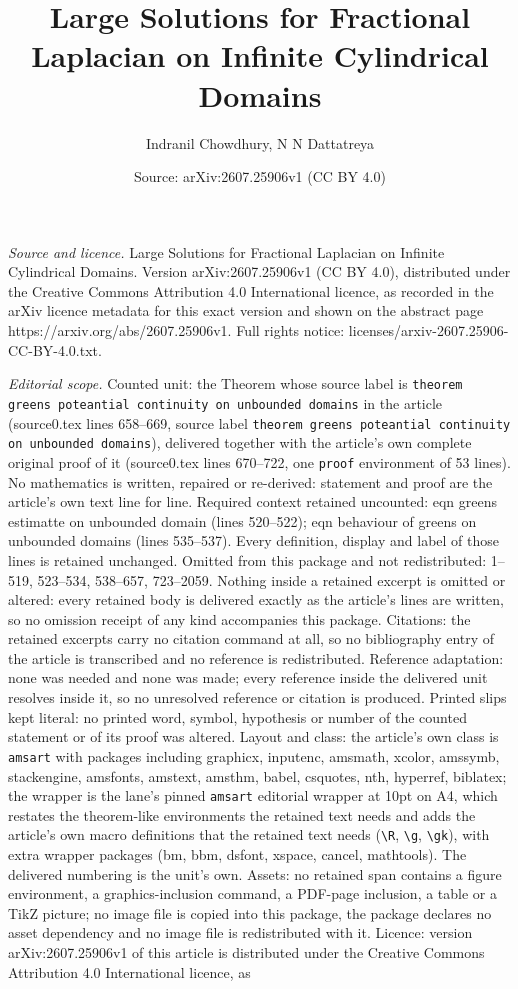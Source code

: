 \documentclass[10pt,a4paper]{amsart}
\title[Large Solutions for Fractional Laplacian on Infinite Cylindr]{Large Solutions for Fractional Laplacian on Infinite Cylindrical Domains}
\author{Indranil Chowdhury, N N Dattatreya}
\date{Source: arXiv:2607.25906v1 (CC BY 4.0)}
\begin{document}
\maketitle

\noindent\emph{Source and licence.} Large Solutions for Fractional Laplacian on Infinite Cylindrical Domains. Version arXiv:2607.25906v1 (CC BY 4.0), distributed under the Creative Commons Attribution 4.0 International licence, as recorded in the arXiv licence metadata for this exact version and shown on the abstract page https://arxiv.org/abs/2607.25906v1. Full rights notice: licenses/arxiv-2607.25906-CC-BY-4.0.txt.\par\smallskip

\noindent\textit{Editorial scope.} Counted unit: the Theorem whose source label is \texttt{theorem greens poteantial continuity on unbounded domains} in the article (source0.tex lines 658--669, source label \texttt{theorem greens poteantial continuity on unbounded domains}), delivered together with the article's own complete original proof of it (source0.tex lines 670--722, one \texttt{proof} environment of 53 lines). No mathematics is written, repaired or re-derived: statement and proof are the article's own text line for line. Required context retained uncounted: eqn greens estimatte on unbounded domain (lines 520--522); eqn behaviour of greens on unbounded domains (lines 535--537). Every definition, display and label of those lines is retained unchanged. Omitted from this package and not redistributed: 1--519, 523--534, 538--657, 723--2059. Nothing inside a retained excerpt is omitted or altered: every retained body is delivered exactly as the article's lines are written, so no omission receipt of any kind accompanies this package. Citations: the retained excerpts carry no citation command at all, so no bibliography entry of the article is transcribed and no reference is redistributed. Reference adaptation: none was needed and none was made; every reference inside the delivered unit resolves inside it, so no unresolved reference or citation is produced. Printed slips kept literal: no printed word, symbol, hypothesis or number of the counted statement or of its proof was altered. Layout and class: the article's own class is \texttt{amsart} with packages including graphicx, inputenc, amsmath, xcolor, amssymb, stackengine, amsfonts, amstext, amsthm, babel, csquotes, nth, hyperref, biblatex; the wrapper is the lane's pinned \texttt{amsart} editorial wrapper at 10pt on A4, which restates the theorem-like environments the retained text needs and adds the article's own macro definitions that the retained text needs (\texttt{\textbackslash R}, \texttt{\textbackslash g}, \texttt{\textbackslash gk}), with extra wrapper packages (bm, bbm, dsfont, xspace, cancel, mathtools). The delivered numbering is the unit's own. Assets: no retained span contains a figure environment, a graphics-inclusion command, a PDF-page inclusion, a table or a TikZ picture; no image file is copied into this package, the package declares no asset dependency and no image file is redistributed with it. Licence: version arXiv:2607.25906v1 of this article is distributed under the Creative Commons Attribution 4.0 International licence, as 
\end{document}
